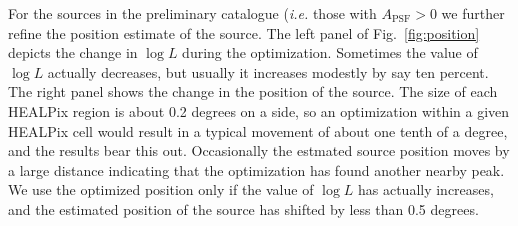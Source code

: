 \documentclass[useAMS,usenatbib]{mn2e}
\begin{document}
For the sources in the preliminary catalogue ({\em i.e.} those with
$A_\mathrm{PSF}>0$ we further refine the position estimate of the
source.  The left panel of Fig.~\ref{fig:position} depicts the change
in $\log L$ during the optimization.  Sometimes the value of $\log L$
actually decreases, but usually it increases modestly by say ten
percent.  The right panel shows the change in the position of the
source.  The size of each HEALPix region is about 0.2 degrees on a
side, so an optimization within a given HEALPix cell would result in a
typical movement of about one tenth of a degree, and the results bear
this out.  Occasionally the estmated source position moves by a
large distance indicating that the optimization has found another
nearby peak.  We use the optimized position only if the value of $\log
L$ has actually increases, and the estimated position of the source
has shifted by less than 0.5 degrees.
\end{document}

